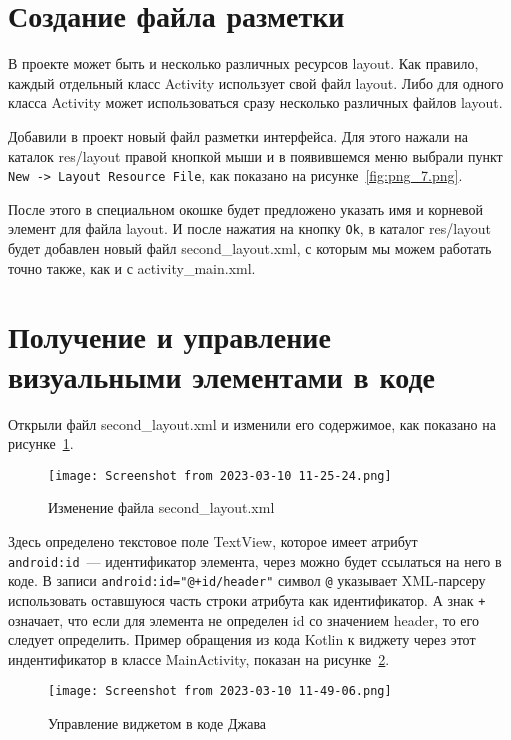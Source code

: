 \section{Создание файла разметки}
В проекте может быть и несколько различных ресурсов layout. Как правило,
каждый отдельный класс Activity использует свой файл layout. Либо для
одного класса Activity может использоваться сразу несколько различных
файлов layout.\par
Добавили в проект новый файл разметки интерфейса. Для этого
нажали на каталок res/layout правой кнопкой мыши и в появившемся меню
выбрали пункт \texttt{New -> Layout Resource File}, как показано
на рисунке~\ref{fig:png_7.png}.


После этого в специальном окошке будет предложено указать имя и
корневой элемент для файла layout. И после нажатия на кнопку \texttt{Ok},
в каталог res/layout будет добавлен новый файл second\_layout.xml,
с которым мы можем работать точно также, как и с activity\_main.xml.\par

\section{Получение и управление визуальными элементами в коде}
Открыли файл second\_layout.xml и изменили его содержимое, как показано
на рисунке~\ref{fig:xml:textview:d}.

\begin{figure}[h!tp]
	\centering
	\texttt{[image: Screenshot from 2023-03-10 11-25-24.png]}
	\caption{Изменение файла second\_layout.xml}
	\label{fig:xml:textview:d}
\end{figure}

Здесь определено текстовое поле TextView, которое имеет
атрибут \texttt{android:id}~--- идентификатор элемента,
через можно будет ссылаться на него в коде.
В записи \texttt{android:id="@+id/header"} символ
\texttt{@} указывает XML-парсеру использовать оставшуюся часть строки
атрибута как идентификатор. А знак \texttt{+} означает, что если для
элемента не определен id со значением header, то его следует
определить.
Пример обращения из кода Kotlin к виджету через этот индентификатор в
классе MainActivity, показан на рисунке~\ref{fig:java:textview:manage}.

\begin{figure}[h!tp]
	\centering
	\texttt{[image: Screenshot from 2023-03-10 11-49-06.png]}
	\caption{Управление виджетом в коде Джава}
	\label{fig:java:textview:manage}
\end{figure}

